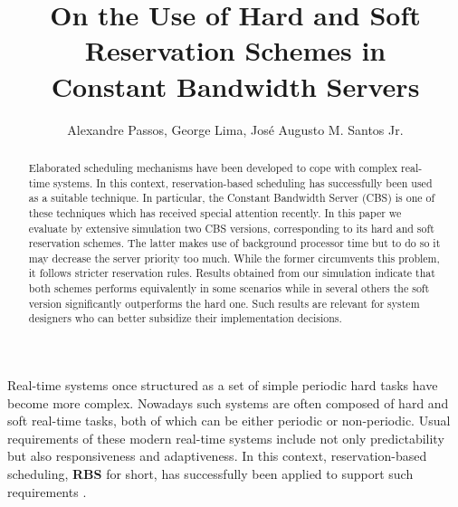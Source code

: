 \documentclass[times, 10pt,twocolumn]{article}
\author{Alexandre Passos, George Lima, Jos\'e Augusto M. Santos Jr.}
\title{On the Use of Hard and Soft Reservation Schemes in \\ Constant Bandwidth Servers}
\begin{document}
\graphicspath{{figs/}{data/}}

\maketitle

\begin{abstract}

Elaborated scheduling mechanisms have been developed to cope with complex real-time systems. In this context,
reservation-based scheduling has successfully been used as a suitable technique. In particular,
the Constant Bandwidth Server (CBS) is one of these techniques which has received special attention recently.
In this paper we evaluate by extensive simulation two CBS versions, corresponding to its hard and soft reservation schemes.
The latter makes use of background processor time but to do so it may decrease the server priority too much. 
While the former circumvents this problem, it follows stricter reservation rules.
Results obtained from our simulation indicate that both schemes performs equivalently in some scenarios while in several others 
the soft version significantly outperforms the hard one. Such results are relevant for system designers who can better subsidize
their implementation decisions.

  
\end{abstract}

\label{sec:introduction}

Real-time systems once structured as a set of
simple periodic hard tasks \cite{liu.ea73:scheduling} have become more
complex. Nowadays such systems are often composed of hard and soft
real-time tasks, both of which can be either periodic or non-periodic.
Usual requirements of these modern real-time systems include not only
predictability but also responsiveness and adaptiveness. In this
context, reservation-based scheduling, \textbf{RBS} for short, has
successfully been applied to support such requirements
\cite{abeni.ea04:resource,mercer.ea94:processor,rajkumar.ea98:resource,sprunt.ea89:aperiodic,steffens.ea03:resource}.
\end{document}
